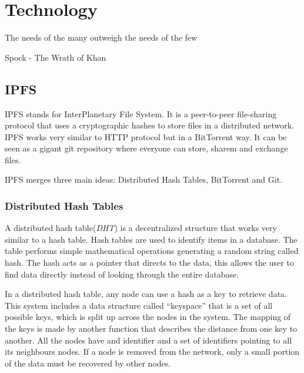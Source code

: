 \chapter{Technology}

\begin{FraseCelebre}
\begin{Frase}
The needs of the many outweigh the needs of the few
\end{Frase}
\begin{Fuente}
Spock - The Wrath of Khan
\end{Fuente}
\end{FraseCelebre}

\section{IPFS}
\label{tech:sec:ipfs}
IPFS stands for InterPlanetary File System. It is a peer-to-peer file-sharing protocol that uses a cryptographic hashes to store files in a distributed network. IPFS works very similar to HTTP protocol but in a BitTorrent way. It can be seen as a gigant git repository where everyone can store, sharem and exchange files\cite{benet2014ipfs}.

IPFS merges three main ideas: Distributed Hash Tables, BitTorrent and Git.

\subsection{Distributed Hash Tables}
A distributed hash table(\emph{DHT}) is a decentralized structure that works very similar to a hash table. Hash tables are used to identify items in a database. The table performs simple mathematical operations generating a random string called hash. The hash acts as a pointer that directs to the data, this allows the user to find data directly instead of looking through the entire database\cite{kaluszka2010distributed}.

In a distributed hash table, any node can use a hash as a key to retrieve data.
This system includes a data structure called ``keyspace'' that is a set of all
possible keys, which is split up across the nodes in the system. The mapping of
the keys is made by another function that describes the distance from one key to
another. All the nodes have and identifier and a set of identifiers pointing to all its neighbours nodes. If a node is removed from the network, only a small
portion of the data must be recovered by other
nodes\cite{kaluszka2010distributed}.

